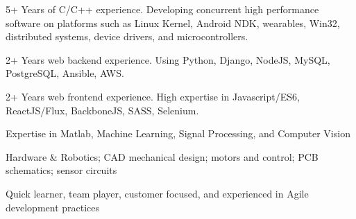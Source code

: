 

\begin{cventries}

\vspace{-5mm}

  \cventry
    {}
    {}
    {}
    {}
    {
      \begin{cvitems} %
        \item {5+ Years of C/C++ experience. Developing concurrent high performance software on platforms such as Linux Kernel, Android NDK, wearables, Win32, distributed systems, device drivers, and microcontrollers.}
        \item {2+ Years web backend experience. Using Python, Django, NodeJS, MySQL, PostgreSQL, Ansible, AWS.}
        \item {2+ Years web frontend experience. High expertise in Javascript/ES6, ReactJS/Flux, BackboneJS, SASS, Selenium.}
        \item {Expertise in Matlab, Machine Learning, Signal Processing, and Computer Vision}
        \item {Hardware \& Robotics; CAD mechanical design; motors and control; PCB schematics; sensor circuits}
        \item {Quick learner, team player, customer focused, and experienced in Agile development practices}
      \end{cvitems}
    }

\end{cventries}